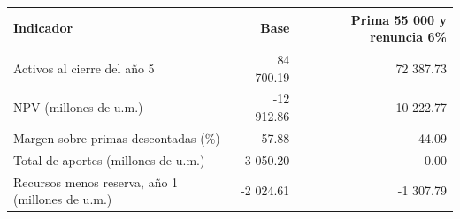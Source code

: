 \begin{tabular}{lrr}
\toprule
Indicador & Base & Prima 55 000 y renuncia 6\% \\
\midrule
Activos al cierre del año 5 & 84 700.19 & 72 387.73 \\
NPV (millones de u.m.) & -12 912.86 & -10 222.77 \\
Margen sobre primas descontadas (\%) & -57.88 & -44.09 \\
Total de aportes (millones de u.m.) & 3 050.20 & 0.00 \\
Recursos menos reserva, año 1 (millones de u.m.) & -2 024.61 & -1 307.79 \\
\bottomrule
\end{tabular}
